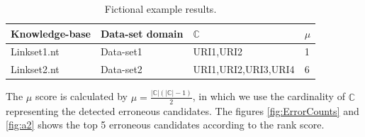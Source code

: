 \begin{table}[H]
	\centering
	\caption{Fictional example results.}
	\label{tab:tuples}
	\begin{tabular}{@{}llll@{}}
		\toprule
		Knowledge-base & Data-set domain & \textbf{$\mathbb{C}$} & $\mu$ \\ \midrule
		Linkset1.nt                 & Data-set1         & URI1,URI2               & 1              \\
		Linkset2.nt                 & Data-set2         & {\small URI1,URI2,URI3,URI4}     & 6              \\ \bottomrule
	\end{tabular}
\end{table}
%
The $\mu$ score is calculated by $\mu = \frac{|\mathbb{C}|(|\mathbb{C}| - 1)}{2}$, in which we use the cardinality of $\mathbb{C}$ representing the detected erroneous candidates. The figures \ref{fig:ErrorCounts} and \ref{fig:a2} shows the top 5 erroneous candidates according to the rank score.

\newcommand{\slice}[4]{
  \pgfmathparse{0.5*#1+0.5*#2}
  \let\midangle\pgfmathresult

  \draw[thick,fill=black!10] (0,0) -- (#1:1) arc (#1:#2:1) -- cycle;

  \node[label=\midangle:#4] at (\midangle:1) {};

  \pgfmathparse{min((#2-#1-10)/110*(-0.3),0)}
  \let\temp\pgfmathresult
  \pgfmathparse{max(\temp,-0.5) + 0.8}
  \let\innerpos\pgfmathresult
  \node at (\midangle:\innerpos) {#3};
}

